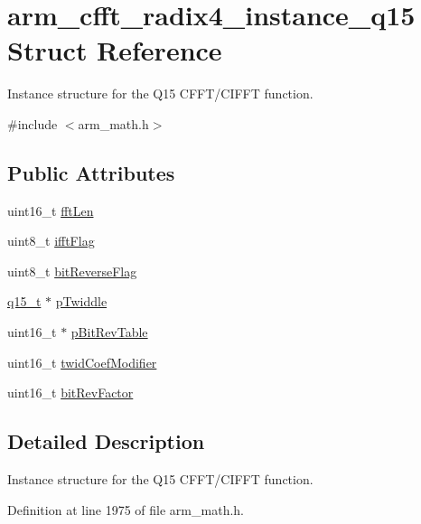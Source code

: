 \hypertarget{structarm__cfft__radix4__instance__q15}{}\section{arm\+\_\+cfft\+\_\+radix4\+\_\+instance\+\_\+q15 Struct Reference}
\label{structarm__cfft__radix4__instance__q15}


Instance structure for the Q15 C\+F\+F\+T/\+C\+I\+F\+FT function.  




{\ttfamily \#include $<$arm\+\_\+math.\+h$>$}

\subsection*{Public Attributes}
\begin{DoxyCompactItemize}
\item 
uint16\+\_\+t \hyperlink{structarm__cfft__radix4__instance__q15_a5fc543e7d84ca8cb7cf6648970f21ca6}{fft\+Len}
\item 
uint8\+\_\+t \hyperlink{structarm__cfft__radix4__instance__q15_a2ecff6ea735cb4d22e922d0fd5736655}{ifft\+Flag}
\item 
uint8\+\_\+t \hyperlink{structarm__cfft__radix4__instance__q15_a101e3f7b0bd6b5b14cd5214f23df4133}{bit\+Reverse\+Flag}
\item 
\hyperlink{arm__math_8h_ab5a8fb21a5b3b983d5f54f31614052ea}{q15\+\_\+t} $\ast$ \hyperlink{structarm__cfft__radix4__instance__q15_a29dd693537e45421a36891f8439e1fba}{p\+Twiddle}
\item 
uint16\+\_\+t $\ast$ \hyperlink{structarm__cfft__radix4__instance__q15_a4acf704ae0cf30b53bf0fbfae8e34a59}{p\+Bit\+Rev\+Table}
\item 
uint16\+\_\+t \hyperlink{structarm__cfft__radix4__instance__q15_af32fdc78bcc27ca385f9b76a0a1f71c3}{twid\+Coef\+Modifier}
\item 
uint16\+\_\+t \hyperlink{structarm__cfft__radix4__instance__q15_a6b010e5f02d1130c621e3d2e26b95df1}{bit\+Rev\+Factor}
\end{DoxyCompactItemize}


\subsection{Detailed Description}
Instance structure for the Q15 C\+F\+F\+T/\+C\+I\+F\+FT function. 

Definition at line 1975 of file arm\+\_\+math.\+h.



